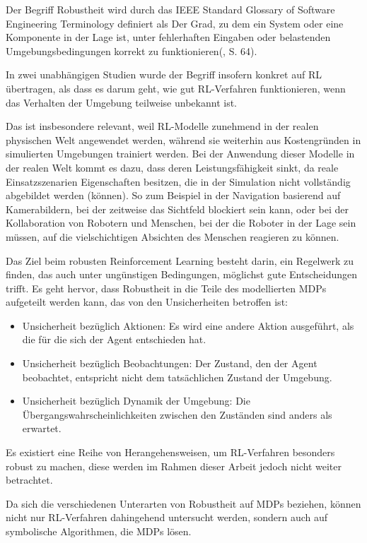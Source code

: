 \label{robustheit}

Der Begriff Robustheit wird durch das IEEE Standard Glossary of Software Engineering Terminology definiert als \glqq Der Grad, zu dem ein System oder eine Komponente in der Lage ist, unter fehlerhaften Eingaben oder belastenden Umgebungsbedingungen korrekt zu funktionieren\grqq{}(\cite{IEEE.1990}, S. 64).

In zwei unabhängigen Studien wurde der Begriff insofern konkret auf RL übertragen, als dass es darum geht, wie gut RL-Verfahren funktionieren, wenn das Verhalten der Umgebung teilweise unbekannt ist.

Das ist insbesondere relevant, weil RL-Modelle zunehmend in der realen physischen Welt angewendet werden, während sie weiterhin aus Kostengründen in simulierten Umgebungen trainiert werden. Bei der Anwendung dieser Modelle in der realen Welt kommt es dazu, dass deren Leistungsfähigkeit sinkt, da reale Einsatzszenarien Eigenschaften besitzen, die in der Simulation nicht vollständig abgebildet werden (können). So zum Beispiel in der Navigation basierend auf Kamerabildern, bei der zeitweise das Sichtfeld blockiert sein kann, oder bei der Kollaboration von Robotern und Menschen, bei der die Roboter in der Lage sein müssen, auf die vielschichtigen Absichten des Menschen reagieren zu können\cite{Moos.2022}\cite{Ni.2021}.

Das Ziel beim robusten Reinforcement Learning besteht darin, ein Regelwerk zu finden, das auch unter ungünstigen Bedingungen, möglichst gute Entscheidungen trifft. Es geht hervor, dass Robustheit in die Teile des modellierten MDPs aufgeteilt werden kann, das von den Unsicherheiten betroffen ist:

\begin{itemize}
	\item Unsicherheit bezüglich Aktionen: Es wird eine andere Aktion ausgeführt, als die für die sich der Agent entschieden hat.
	\item Unsicherheit bezüglich Beobachtungen: Der Zustand, den der Agent beobachtet, entspricht nicht dem tatsächlichen Zustand der Umgebung.
	\item Unsicherheit bezüglich Dynamik der Umgebung: Die Übergangswahrscheinlichkeiten zwischen den Zuständen sind anders als erwartet.
\end{itemize}

Es existiert eine Reihe von Herangehensweisen, um RL-Verfahren besonders robust zu machen, diese werden im Rahmen dieser Arbeit jedoch nicht weiter betrachtet\cite{Moos.2022}\cite{Ni.2021}.

Da sich die verschiedenen Unterarten von Robustheit auf MDPs beziehen, können nicht nur RL-Verfahren dahingehend untersucht werden, sondern auch auf symbolische Algorithmen, die MDPs lösen.
